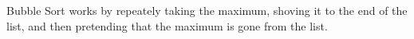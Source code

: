 \documentclass{article}
\begin{document}
Bubble Sort works by repeately taking the maximum, shoving it to the 
end of the list, and then pretending that the maximum is gone from the 
list. 
\end{document}
